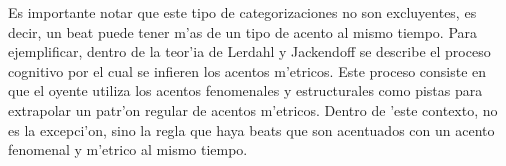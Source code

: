 Es importante notar que este tipo de categorizaciones no son excluyentes, es decir, un beat puede tener m'as de un tipo de acento al mismo tiempo.
Para ejemplificar, dentro de la teor'ia de Lerdahl y Jackendoff se describe el proceso cognitivo por el cual se infieren los acentos m'etricos. Este
proceso consiste en que el oyente utiliza los acentos fenomenales y estructurales como pistas para extrapolar un patr'on regular de acentos m'etricos. 
Dentro de 'este contexto, no es la excepci'on, sino la regla que haya beats que son acentuados con un acento fenomenal y m'etrico al mismo tiempo.


